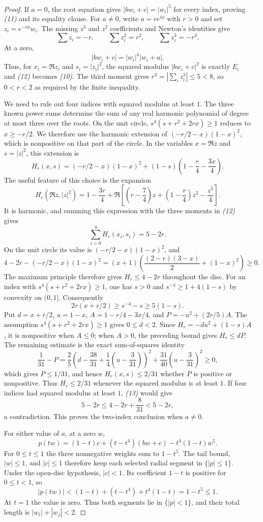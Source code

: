 \begin{proof}
If $a=0$, the root equation gives $|bw_i+c|=|w_i|^5$ for every
index, proving \emph{(11)} and its equality clause. For $a\ne0$, write
$a=re^{i\phi}$ with $r>0$ and set $z_i=e^{-i\phi}w_i$.
The missing $z^3$ and $z^2$ coefficients and Newton's identities give
\[
 \sum z_i=-r,\qquad \sum z_i^2=r^2,\qquad
 \sum z_i^3=-r^3.                                 \tag{12}
\]
At a zero,
\[
 |bw_i+c|=|w_i|^4|w_i+a|.
\]
Thus, for $x_i=\Re z_i$ and $s_i=|z_i|^2$, the squared modulus $|bw_i+c|^2$ is exactly
$E_i$ and \emph{(12)} becomes \emph{(10)}. The third moment gives
$r^3=|\sum_i z_i^3|\le5<8$, so $0<r<2$ as required by the finite
inequality.

We need to rule out four indices with squared modulus at least $1$.
The three known power sums determine the sum of any real harmonic
polynomial of degree at most three over the roots. On the unit circle,
$s^4(s+r^2+2rx)\ge1$ reduces to $x\ge-r/2$. We therefore use the harmonic
extension of $(-r/2-x)(1-x)^2$, which is nonpositive on that part of the
circle. In the variables $x=\Re z$ and $s=|z|^2$, this extension is
\[
 H_r(x,s)=(-r/2-x)(1-x)^2
 +(1-s)\left(1-\frac r4-\frac{3x}{4}\right).
\]
The useful feature of this choice is the expansion
\[
 H_r(\Re z,|z|^2)
 =1-\frac{3r}{4}+
 \Re\!\left[\left(r-\frac74\right)z+
             \left(1-\frac r4\right)z^2-\frac{z^3}{4}\right].
\]
It is harmonic, and summing this expression with the three moments in
\emph{(12)} gives
\[
 \sum_{i=0}^4H_r(x_i,s_i)=5-2r.                  \tag{13}
\]
On the unit circle its value is $(-r/2-x)(1-x)^2$, and
\[
 4-2r-(-r/2-x)(1-x)^2
 =(x+1)\left(\frac{(2-r)(3-x)}2+(1-x)^2\right)\ge0.
\]
The maximum principle therefore gives $H_r\le4-2r$ throughout the disc.
For an index with $s^4(s+r^2+2rx)\ge1$, one has $s>0$ and
$s^{-4}\ge1+4(1-s)$ by convexity on $(0,1]$. Consequently
\[
 2r(x+r/2)\ge s^{-4}-s\ge5(1-s).
\]
Put $d=x+r/2$, $u=1-x$, $A=1-r/4-3x/4$, and
$P=-u^2+(2r/5)A$.  The assumption $s^4(s+r^2+2rx)\ge1$ gives $0\le d<2$.  Since
$H_r=-du^2+(1-s)A$, it is nonpositive when $A\le0$; when $A>0$,
the preceding bound gives $H_r\le dP$.  The remaining estimate is the exact
sum-of-squares identity
\[
 \frac1{31}-P
 =\frac25\left(d-\frac{38}{31}
               +\frac14(u-\frac3{31})\right)^2
  +\frac{31}{40}\left(u-\frac3{31}\right)^2\ge0,
\]
which gives $P\le1/31$, and hence $H_r(x,s)\le2/31$ whether $P$ is
positive or nonpositive.  Thus $H_r\le2/31$ whenever the squared modulus is at least $1$.
If four indices had squared modulus at least $1$, \emph{(13)} would give
\[
 5-2r\le4-2r+\frac8{31}<5-2r,
\]
a contradiction. This proves the two-index conclusion when $a\ne0$.

For either value of $a$, at a zero $w$,
\[
 p(tw)=(1-t)c+(t-t^4)(bw+c)-t^4(1-t)w^5.
\]
For $0\le t\le1$ the three nonnegative weights sum to $1-t^5$.
The tail bound, $|w|\le1$, and $|c|\le1$ therefore keep each selected
radial segment in $\{|p|\le1\}$. Under the open-disc hypothesis,
$|c|<1$. Its coefficient $1-t$ is positive for $0\le t<1$, so
\[
 |p(tw)|<(1-t)+(t-t^4)+t^4(1-t)=1-t^5\le1.
\]
At $t=1$ the value is zero. Thus both segments lie in $\{|p|<1\}$,
and their total length is $|w_i|+|w_j|<2$.
\end{proof}

